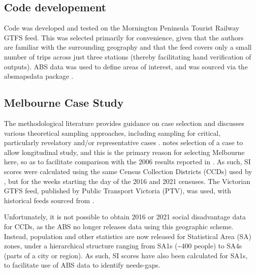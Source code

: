 \documentclass[preprint, 3p,
authoryear]{elsarticle} %
\begin{document}
\subsection{Code developement}\label{code-developement}

Code was developed and tested on the Mornington Peninsula Tourist
Railway GTFS feed. This was selected primarily for convenience, given
that the authors are familiar with the surrounding geography and that
the feed covers only a small number of trips across just three stations
(thereby facilitating hand verification of outputs). ABS data was used
to define areas of interest, and was sourced via the absmapsdata package
\citep{R-absmapsdata}.

\subsection{Melbourne Case Study}\label{melbourne-case-study}

The methodological literature provides guidance on case selection and
discusses various theoretical sampling approaches, including sampling
for critical, particularly revelatory and/or representative cases
\citep{Eisenhardt1989aa, Yin2009aa, Denscombe2007aa, Eisenhardt2007TBfC}.
\citet{Yin2009aa} notes selection of a case to allow longitudinal study,
and this is the primary reason for selecting Melbourne here, so as to
facilitate comparison with the 2006 results reported in
\citet{currie2010identifying}. As such, SI scores were calculated using
the same Census Collection Districts (CCDs) used by
\citet{currie2010identifying}, but for the weeks starting the day of the
2016 and 2021 censuses. The Victorian GTFS feed, published by Public
Transport Victoria (PTV), was used, with historical feeds sourced from
\citet{transitfeeds_victoria:2023aa}.

Unfortunately, it is not possible to obtain 2016 or 2021 social
disadvantage data for CCDs, as the ABS no longer releases data using
this geographic scheme. Instead, population and other statistics are now
released for Statistical Area (SA) zones, under a hierarchical structure
ranging from SA1s (\textasciitilde400 people) to SA4s (parts of a city
or region)\citep{ABSmaps}. As such, SI scores have also been calculated
for SA1s, to facilitate use of ABS data to identify needs-gaps.
\end{document}
